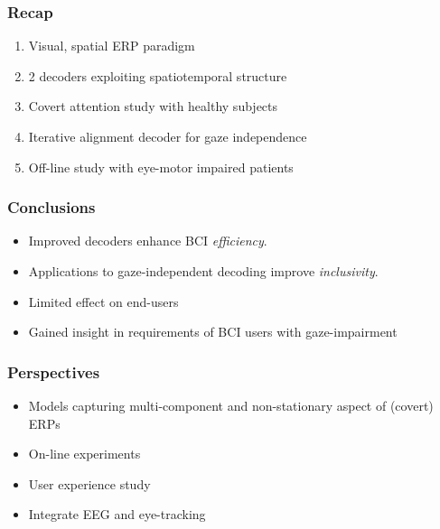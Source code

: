 \documentclass{kul-ulille-beamer}
\begin{document}
\begin{frame}
  \frametitle{Recap}
  \begin{enumerate}
    \item Visual, spatial ERP paradigm
    \bigskip
    \item 2 decoders exploiting spatiotemporal structure
    \bigskip
    \item Covert attention study with healthy subjects
    \bigskip
    \item Iterative alignment decoder for gaze independence
    \bigskip
    \item Off-line study with eye-motor impaired patients
  \end{enumerate}
\end{frame}

\begin{frame}
    \frametitle{Conclusions}
    \begin{changemargin}
    \begin{itemize}
      \item Improved decoders enhance BCI \emph{efficiency}.
      \bigskip
      \item Applications to gaze-independent decoding improve \emph{inclusivity}.
      \bigskip
      \item Limited effect on end-users
      \bigskip
      \item Gained insight in requirements of BCI users with gaze-impairment
    \end{itemize}
  \end{changemargin}
\end{frame}

\begin{frame}
  \frametitle{Perspectives}
  \begin{changemargin}
    \begin{itemize}
     \item Models capturing multi-component and
       non-stationary aspect of (covert) ERPs
     \bigskip
     \item On-line experiments
     \bigskip
     \item User experience study
     \bigskip
     \item Integrate EEG and eye-tracking
     \bigskip
  \end{itemize}
  \end{changemargin}
\end{frame}
\end{document}
